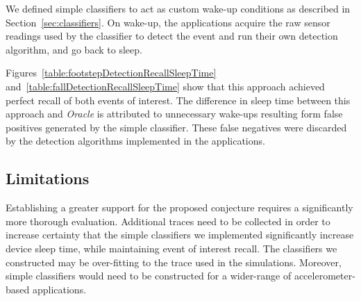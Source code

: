 We defined simple classifiers to act as custom wake-up 
conditions as described in Section~\ref{sec:classifiers}. On
wake-up, the applications acquire the raw sensor readings used by the
classifier to detect the event and run their own detection algorithm, and go back to sleep.

Figures~\ref{table:footstepDetectionRecallSleepTime} and~\ref{table:fallDetectionRecallSleepTime} 
show that this approach achieved perfect recall of both events of interest. The difference in sleep time
between this approach and {\em Oracle} is attributed to unnecessary wake-ups resulting form false positives 
generated by the simple classifier. These false negatives were discarded by the detection algorithms 
implemented in the applications. 

\subsection{Limitations}

Establishing a greater support for the proposed conjecture requires a significantly more 
thorough evaluation. Additional traces need to be collected in order to increase certainty that the simple
classifiers we implemented significantly increase device sleep time, while maintaining event of interest
recall. The classifiers we constructed may be over-fitting to the trace used in the simulations. Moreover, 
simple classifiers would need to be constructed for a wider-range of accelerometer-based applications.


 